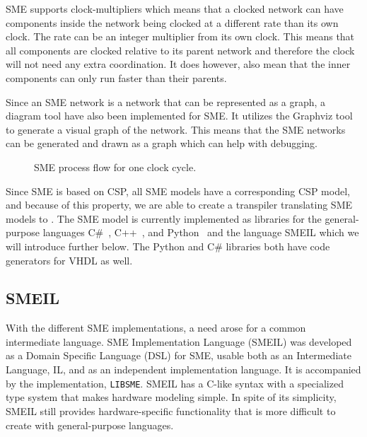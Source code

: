 SME supports clock-multipliers which means that a clocked network can have components inside the network being clocked at a different rate than its own clock. The rate can be an integer multiplier from its own clock. This means that all components are clocked relative to its parent network and therefore the clock will not need any extra coordination. It does however, also mean that the inner components can only run faster than their parents.

Since an SME network is a network that can be represented as a graph, a diagram tool have also been implemented for SME. It utilizes the Graphviz tool to generate a visual graph of the network. This means that the SME networks can be generated and drawn as a graph which can help with debugging.


\begin{figure}[!ht]
  \centering
  \caption{SME process flow for one clock cycle.}
  \label{fig:sme_process_flow}
\end{figure}
Since SME is based on CSP, all SME models have a
corresponding CSP model, and because of this property, we are able to create a transpiler translating SME models to \cspm{}.
The SME model is currently implemented as libraries for the general-purpose languages C\#~\cite{Skovhede}, C++~\cite{asheim2015}, and Python~\cite{asheim2016vhdl} and the language SMEIL which we will introduce further below. The Python and C\# libraries both have code generators for VHDL as well.
\newpage
\subsection{SMEIL}
\label{SMEIL-section}
With the different SME implementations, a need arose for a common intermediate language. SME Implementation Language (SMEIL) was developed as a Domain Specific Language (DSL) for SME, usable both as an Intermediate Language, IL, and as an independent implementation language. It is accompanied by the implementation, \texttt{LIBSME}. %
SMEIL has a C-like syntax with a specialized type system that makes hardware modeling simple. In spite of its simplicity, SMEIL still provides hardware-specific functionality that is more difficult to create with general-purpose languages.

